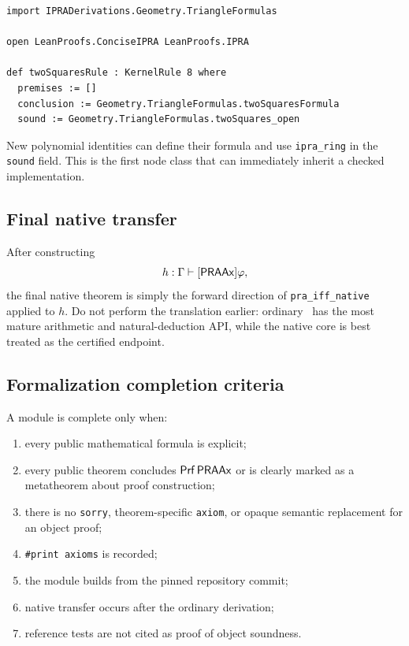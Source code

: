 \begin{lstlisting}
import IPRADerivations.Geometry.TriangleFormulas

open LeanProofs.ConciseIPRA LeanProofs.IPRA

def twoSquaresRule : KernelRule 8 where
  premises := []
  conclusion := Geometry.TriangleFormulas.twoSquaresFormula
  sound := Geometry.TriangleFormulas.twoSquares_open
\end{lstlisting}
New polynomial identities can define their formula and use \texttt{ipra\_ring} in the \texttt{sound} field.  This is the first node class that can immediately inherit a checked implementation.

\subsection{Final native transfer}

After constructing
\[
 h:\Gamma\vdash[\mathsf{PRAAx}]\varphi,
\]
the final native theorem is simply the forward direction of \texttt{pra\_iff\_native} applied to \(h\).  Do not perform the translation earlier: ordinary \iPRA\ has the most mature arithmetic and natural-deduction API, while the native core is best treated as the certified endpoint.

\subsection{Formalization completion criteria}

A module is complete only when:
\begin{enumerate}[label=(\arabic*)]
  \item every public mathematical formula is explicit;
  \item every public theorem concludes \(\mathsf{Prf}\,\mathsf{PRAAx}\) or is clearly marked as a metatheorem about proof construction;
  \item there is no \texttt{sorry}, theorem-specific \texttt{axiom}, or opaque semantic replacement for an object proof;
  \item \texttt{\#print axioms} is recorded;
  \item the module builds from the pinned repository commit;
  \item native transfer occurs after the ordinary derivation;
  \item reference tests are not cited as proof of object soundness.
\end{enumerate}
